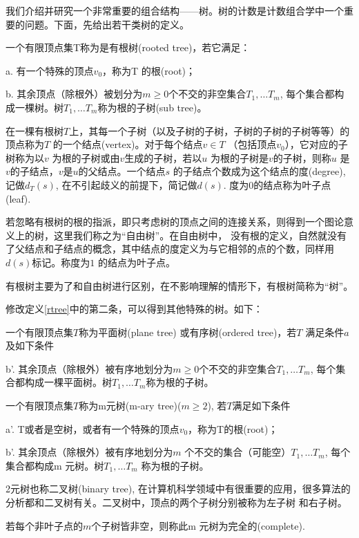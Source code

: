 \documentclass[a4paper,11pt]{article}
\begin{document}
我们介绍并研究一个非常重要的组合结构——树。树的计数是计数组合学中一个重要的问题。下面，先给出若干类树的定义。
{
 \label{rtree}一个有限顶点集T称为是有根树(rooted tree)，若它满足：
{\itemize
\item[a.]有一个特殊的顶点$v_0$，称为T 的根(root)；
\item[b.]其余顶点（除根外）被划分为$m\geqslant0$个不交的非空集合$T_1,\ldots T_m$, 每个集合都构成一棵树。树$T_1,\ldots T_m$称为根的子树(sub tree)。

}
}
在一棵有根树$T$上，其每一个子树（以及子树的子树，子树的子树的子树等等）的顶点称为$T$ 的一个结点(vertex)。对于每个结点$v\in T$
（包括顶点$v_0$），它对应的子树称为以$v$ 为根的子树或由$v$生成的子树，若以$u$ 为根的子树是$v$的子树，则称$u$
是$v$的子结点，$v$是$u$的父结点。一个结点$s$ 的子结点个数成为这个结点的度(degree), 记做$d_T(s)$, 在不引起歧义的前提下，简记做$d(s)$. 度为$0$的结点称为叶子点(leaf).

若忽略有根树的根的指派，即只考虑树的顶点之间的连接关系，则得到一个图论意义上的树，这里我们称之为“自由树”。在自由树中，
没有根的定义，自然就没有了父结点和子结点的概念，其中结点的度定义为与它相邻的点的个数，同样用$d(s)$标记。称度为$1$ 的结点为叶子点。

有根树主要为了和自由树进行区别，在不影响理解的情形下，有根树简称为“树”。

修改定义\ref{rtree}中的第二条，可以得到其他特殊的树。如下：
{
 一个有限顶点集$T$称为平面树(plane tree) 或有序树(ordered tree)，若$T$ 满足条件$a$ 及如下条件
{\itemize

\item[b'.]其余顶点（除根外）被有序地划分为$m\geqslant0$个不交的非空集合$T_1,\ldots T_m$, 每个集合都构成一棵平面树。树$T_1,\ldots T_m$称为根的子树。

}
}
{
 一个有限顶点集$T$称为m元树(m-ary tree)($m\geqslant2$), 若$T$满足如下条件
{\itemize
\item[a'.]T或者是空树，或者有一个特殊的顶点$v_0$，称为T的根(root)；

\item[b'.]其余顶点（除根外）被有序地划分为$m$ 个不交的集合（可能空）$T_1,\ldots T_m$, 每个集合都构成m 元树。树$T_1,\ldots T_m$ 称为根的子树。

}
}

2元树也称二叉树(binary tree), 在计算机科学领域中有很重要的应用，很多算法的分析都和二叉树有关。二叉树中，顶点的两个子树分别被称为左子树
和右子树。

若每个非叶子点的$m$个子树皆非空，则称此m 元树为完全的(complete).
\end{document}
